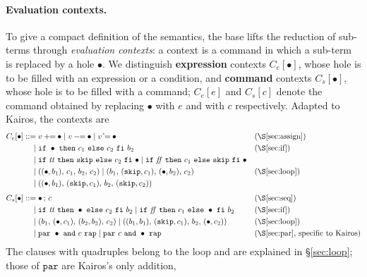 \paragraph{Evaluation contexts.} To give a compact definition of the
semantics, the base lifts the reduction of sub-terms through
\emph{evaluation contexts}: a context is a command in which a
sub-term is replaced by a hole $\bullet$. We distinguish \textbf{expression} contexts $C_e[\bullet]$, whose hole is to be filled with
an expression or a condition, and \textbf{command} contexts
$C_s[\bullet]$, whose hole is to be filled with a command; $C_e[e]$ and $C_s[c]$
denote the command obtained by replacing $\bullet$ with $e$ and
with $c$ respectively. Adapted to Kairos, the contexts are
{\footnotesize
\[
\begin{aligned}
C_e[\bullet] ::={}&
  v \mathbin{+\!\!=} \bullet \mid v \mathbin{-\!\!=} \bullet \mid v \mathbin{\hat{}\!=} \bullet
  && \text{(\S\ref{sec:assign})}\\
 \mid{}& \mathtt{if}\ \bullet\ \mathtt{then}\ c_1\ \mathtt{else}\ c_2\ \mathtt{fi}\ b_2
  && \text{(\S\ref{sec:if})}\\
 \mid{}& \mathtt{if}\ \ttt\ \mathtt{then}\ \mathtt{skip}\ \mathtt{else}\ c_2\ \mathtt{fi}\ \bullet
  \mid \mathtt{if}\ \ff\ \mathtt{then}\ c_1\ \mathtt{else}\ \mathtt{skip}\ \mathtt{fi}\ \bullet & \\
 \mid{}& ((\bullet,b_1),\, c_1,\, b_2,\, c_2)
  \mid (b_1,\, (\mathtt{skip},c_1),\, (\bullet,b_2),\, c_2)
  && \text{(\S\ref{sec:loop})}\\
 \mid{}& ((\bullet,b_1),\, (\mathtt{skip},c_1),\, b_2,\, (\mathtt{skip},c_2)) & \\[0.4em]
C_s[\bullet] ::={}& \bullet\,;\,c
  && \text{(\S\ref{sec:seq})}\\
 \mid{}& \mathtt{if}\ \ttt\ \mathtt{then}\ \bullet\ \mathtt{else}\ c_2\ \mathtt{fi}\ b_2
  \mid \mathtt{if}\ \ff\ \mathtt{then}\ c_1\ \mathtt{else}\ \bullet\ \mathtt{fi}\ b_2
  && \text{(\S\ref{sec:if})}\\
 \mid{}& (b_1,\, (\bullet,c_1),\, (b_2,b_2),\, c_2)
  \mid ((b_1,b_1),\, (\mathtt{skip},c_1),\, b_2,\, (\bullet,c_2))
  && \text{(\S\ref{sec:loop})}\\
 \mid{}& \mathtt{par}\ \bullet\ \mathtt{and}\ c\ \mathtt{rap}
  \mid \mathtt{par}\ c\ \mathtt{and}\ \bullet\ \mathtt{rap}
  && \text{(\S\ref{sec:par}, specific to Kairos)}
\end{aligned}
\]
}
The clauses with quadruples belong to the loop and are explained in
\S\ref{sec:loop}; those of $\mathtt{par}$ are Kairos's only addition,
